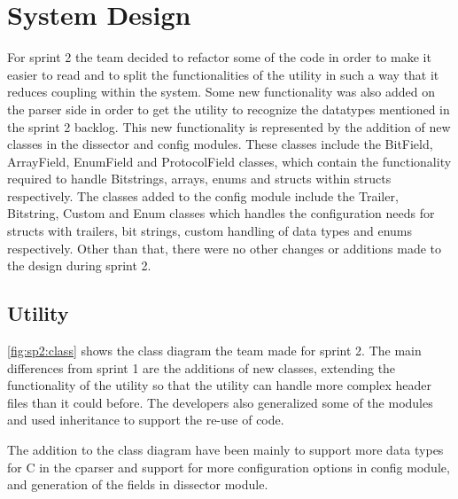 \section{System Design}
\label{sec:sp2:design}
For sprint 2 the team decided to refactor some of the code in order to make it easier to read and to split the functionalities of the \gls{utility} in such a way that it reduces coupling within the system. Some new functionality was also added on the \gls{parser} side in order to get the \gls{utility} to recognize the datatypes mentioned in the sprint 2 backlog. This new functionality is represented by the addition of new classes in the \gls{dissector} and config modules. These classes include the BitField, ArrayField, EnumField and ProtocolField classes, which contain the functionality required to handle Bitstrings, \glspl{array}, \glspl{enum} and \glspl{struct} within \glspl{struct} respectively. The classes added to the config module include the Trailer, Bitstring, Custom and Enum classes which handles the configuration needs for \glspl{struct} with \gls{trailers}, \glspl{bit string}, custom handling of data types and \glspl{enum} respectively. Other than that, there were no other changes or additions made to the design during sprint 2.

\subsection{Utility}
\autoref{fig:sp2:class} shows the class diagram the team made for sprint 2. 
The main differences from sprint 1 are the additions of new classes, extending 
the functionality of the \gls{utility} so that the \gls{utility} can handle 
more complex \gls{header} files than it could before. The developers also 
generalized some of the modules and used inheritance to support the re-use of 
code.

The addition to the class diagram have been mainly to support more data types 
for C in the cparser and support for more configuration options in config 
module, and generation of the fields in dissector module.
 
